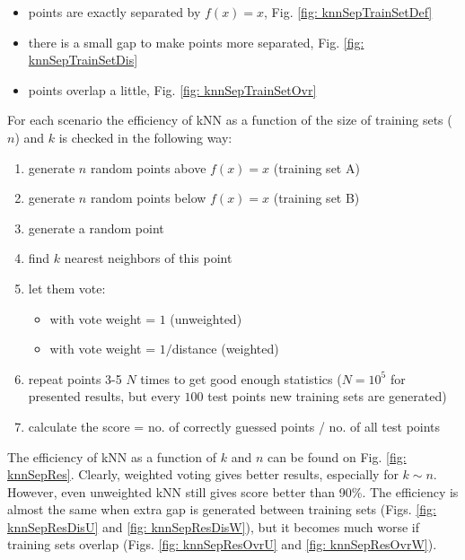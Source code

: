 \begin{itemize}
 \item points are exactly separated by $f(x) = x$, Fig. \ref{fig: knnSepTrainSetDef}
 \item there is a small gap to make points more separated, Fig. \ref{fig: knnSepTrainSetDis}
 \item points overlap a little, Fig. \ref{fig: knnSepTrainSetOvr}
\end{itemize}

For each scenario the efficiency of kNN as a function of the size of training sets ($n$) and $k$ is checked in the following way:

\begin{enumerate}
 \item generate $n$ random points above $f(x) = x$ (training set A)
 \item generate $n$ random points below $f(x) = x$ (training set B)
 \item generate a random point
 \item find $k$ nearest neighbors of this point
 \item let them vote:
 \begin{itemize}
  \item with vote weight = $1$ (unweighted)
  \item with vote weight = $1/$distance (weighted)
 \end{itemize}
 \item repeat points 3-5 $N$ times to get good enough statistics ($N = 10^5$ for presented results, but every $100$ test points new training sets are generated)
 \item calculate the score = no. of correctly guessed points / no. of all test points
\end{enumerate}

The efficiency of kNN as a function of $k$ and $n$ can be found on Fig. \ref{fig: knnSepRes}. Clearly, weighted voting gives better results, especially for $k \sim n$. However, even unweighted kNN still gives score better than 90\%. The efficiency is almost the same when extra gap is generated between training sets (Figs. \ref{fig: knnSepResDisU} and \ref{fig: knnSepResDisW}), but it becomes much worse if training sets overlap (Figs. \ref{fig: knnSepResOvrU} and \ref{fig: knnSepResOvrW}).

